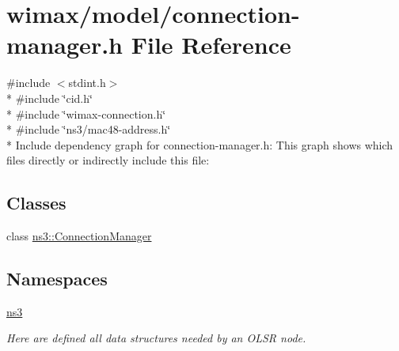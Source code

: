 \hypertarget{connection-manager_8h}{}\section{wimax/model/connection-\/manager.h File Reference}
\label{connection-manager_8h}
{\ttfamily \#include $<$stdint.\+h$>$}\\*
{\ttfamily \#include \char`\"{}cid.\+h\char`\"{}}\\*
{\ttfamily \#include \char`\"{}wimax-\/connection.\+h\char`\"{}}\\*
{\ttfamily \#include \char`\"{}ns3/mac48-\/address.\+h\char`\"{}}\\*
Include dependency graph for connection-\/manager.h\+:
This graph shows which files directly or indirectly include this file\+:
\subsection*{Classes}
\begin{DoxyCompactItemize}
\item 
class \hyperlink{classns3_1_1ConnectionManager}{ns3\+::\+Connection\+Manager}
\end{DoxyCompactItemize}
\subsection*{Namespaces}
\begin{DoxyCompactItemize}
\item 
 \hyperlink{namespacens3}{ns3}
\begin{DoxyCompactList}\small\item\em Here are defined all data structures needed by an O\+L\+SR node. \end{DoxyCompactList}\end{DoxyCompactItemize}
